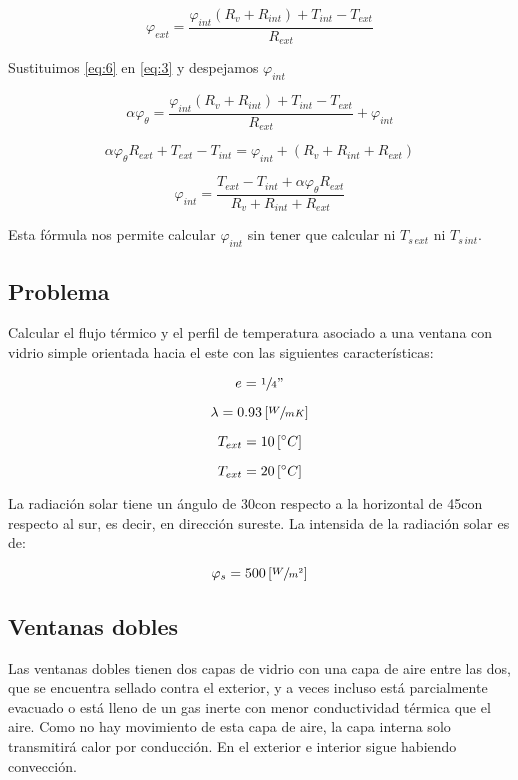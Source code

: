 \documentclass[11pt]{article}
\begin{document}
\begin{equation}\label{eq:6}
    \varphi _{ ext } = \frac{ \varphi _{ int } \left( R_v + R_{ int } \right) + T_{ int } - T_{ ext } }{ R_{ ext } }
\end{equation}

Sustituimos \ref{eq:6} en \ref{eq:3} y despejamos $ \varphi _{ int } $

\[ \alpha \varphi _\theta = \frac{ \varphi _{ int } \left( R_v + R_{ int } \right) + T_{ int } - T_{ ext } }{ R_{ ext } } + \varphi_{ int } \]

\[ \alpha \varphi _ \theta R_{ ext } + T_{ ext } - T_{ int } = \varphi _{ int } + \left( R_v + R_{ int } + R_{ ext } \right) \]

\[  \boxed{ \varphi _{ int } = \frac{ T_{ ext } - T_{ int } + \alpha \varphi _\theta R_{ ext } }{ R_v + R_{ int } + R_{ ext } } } \]

Esta fórmula nos permite calcular $ \varphi _{ int } $ sin tener que calcular ni $ T_{ s \, ext }  $ ni $ T_{ s \, int } $.

\subsection*{Problema}

Calcular el flujo térmico y el perfil de temperatura asociado a una ventana con vidrio simple orientada hacia el este con las siguientes características:

\[ e = \sfrac{1}{4}" \]

\[ \lambda = 0.93 \left[ \sfrac{ W }{ m K } \right] \]

\[ T_{ ext } = 10 \left[ \degree C \right] \]

\[ T_{ ext } = 20 \left[ \degree C \right] \]

La radiación solar tiene un ángulo de 30\degree con respecto a la horizontal de 45\degree con respecto al sur, es decir, en dirección sureste. La intensida de la radiación solar es de:

\[ \varphi _s = 500 \left[ \sfrac{ W }{ m ^2 } \right] \]

\subsection{Ventanas dobles}

Las ventanas dobles tienen dos capas de vidrio con una capa de aire entre las dos, que se encuentra sellado contra el exterior, y a veces incluso está parcialmente evacuado o está lleno de un gas inerte con menor conductividad térmica que el aire. Como no hay movimiento de esta capa de aire, la capa interna solo transmitirá calor por conducción. En el exterior e interior sigue habiendo convección.
\end{document}
